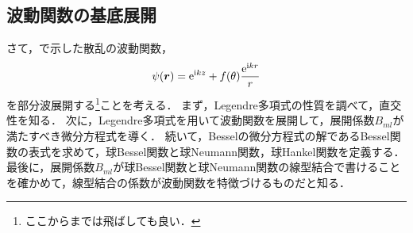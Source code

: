 \documentclass{report}
\begin{document}
  \subsection{波動関数の基底展開}
    さて，で示した散乱の波動関数，
    \begin{align}
      \psi(\bm{r}) = \mathrm{e}^{\mathrm{i} kz} + f(\theta)\frac{\mathrm{e}^{\mathrm{i} kr}}{r}
    \end{align}
    を部分波展開する\footnote{ここからまでは飛ばしても良い．}ことを考える．
    まず，Legendre多項式の性質を調べて，直交性を知る．
    次に，Legendre多項式を用いて波動関数を展開して，展開係数$B_{ml}$が満たすべき微分方程式を導く．
    続いて，Besselの微分方程式の解であるBessel関数の表式を求めて，球Bessel関数と球Neumann関数，球Hankel関数を定義する．
    最後に，展開係数$B_{ml}$が球Bessel関数と球Neumann関数の線型結合で書けることを確かめて，線型結合の係数が波動関数を特徴づけるものだと知る．
\end{document}
